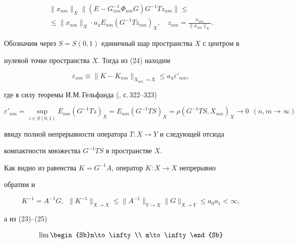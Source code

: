 \begin{pf}
\begin{multline}
\|x_{nm}\|_X\|(E-G^{-1}_{nm}\Phi_{nm}G)G^{-1}T z_{nm}\|\le \\ 


% 


\le \|x_{nm}\|_X\cdot a_4E_{nm}(G^{-1}T z_{nm})_X,\quad 


z_{nm}=\frac{x_{nm}}{\|x_{nm}\|_X}. 


\end{multline} 


 


Обозначим через $S=S(0,1)$ единичный шар пространства $X$ с центром в 


нулевой точке пространства $X$. Тогда из (24) находим 


\begin{equation} 


\varepsilon_{nm}\equiv\|K-K_{nm}\|_{X_{nm}\to X}\le 


a_4\varepsilon'_{nm}, 


\end{equation} 


где в силу теоремы И.М.\,Гельфанда (\cite{6}, с.\,322--323) 


$$ 


\varepsilon'_{nm}=\sup_{z\in S(0,1)}E_{nm}(G^{-1}T z)_X= 


E_{nm}(G^{-1}T S)_X=\rho(G^{-1}T S,X_{nm})_X\to0 


\ \ (n,m\to\infty) 


$$ 


ввиду полной непрерывности оператора $T:X\to Y$ и следующей отсюда 


компактности множества $G^{-1}T S$ в пространстве $X$. 


 


Как видно из равенства $K=G^{-1}A$, оператор $K:X\to X$ непрерывно 


обратим и 


\begin{equation} 


K^{-1}=A^{-1}G,\ \ \|K^{-1}\|_{X\to X}\le 


\|A^{-1}\|_{Y\to X}\|G\|_{X\to Y}\le a_0a_1<\infty, 


\end{equation} 


а из (23)--(25) 


\begin{equation} 


\lim\begin{Sb}n\to\infty \\ m\to\infty \end{Sb} 



\end{equation}
\end{pf}

